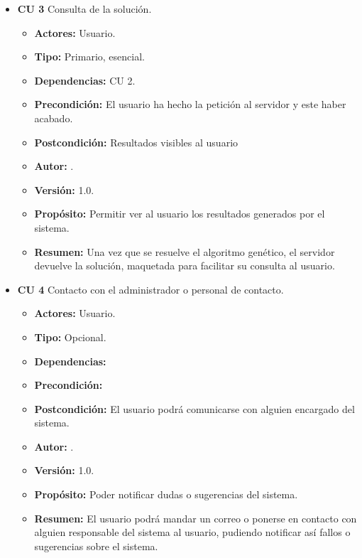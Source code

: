\begin{itemize}
	\item \textbf{CU 3} Consulta de la solución.
	\begin{itemize}
		\item \textbf{Actores:} Usuario.
		\item \textbf{Tipo:} Primario, esencial.
		\item \textbf{Dependencias:} CU 2.
		\item \textbf{Precondición:} El usuario ha hecho la petición al servidor y este haber acabado.
		\item \textbf{Postcondición:} Resultados visibles al usuario
		\item\textbf{ Autor:} {\autor}.
		\item \textbf{Versión:} 1.0.
		\item \textbf{Propósito:} Permitir ver al usuario los resultados generados por el sistema.
		\item \textbf{Resumen:} Una vez que se resuelve el algoritmo genético, el servidor devuelve la solución, maquetada para facilitar su consulta al usuario.
	\end{itemize}

	\item \textbf{CU 4} Contacto con el administrador o personal de contacto.
	\begin{itemize}
		\item \textbf{Actores:} Usuario.
		\item \textbf{Tipo:} Opcional.
		\item \textbf{Dependencias:} 
		\item \textbf{Precondición:}
		\item \textbf{Postcondición:} El usuario podrá comunicarse con alguien encargado del sistema.
		\item\textbf{ Autor:} {\autor}.
		\item \textbf{Versión:} 1.0.
		\item \textbf{Propósito:} Poder notificar dudas o sugerencias del sistema.
		\item \textbf{Resumen:} El usuario podrá mandar un correo o ponerse en contacto con alguien responsable del sistema al usuario, pudiendo notificar así fallos o sugerencias sobre el sistema.
	\end{itemize}	

\bigskip


\end{itemize}
